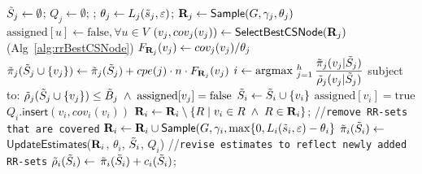 
\IncMargin{1em}
\begin{algorithm}[t!]
\caption{\fastcs}
\label{alg:fastCS}
\Indm
{\small
{}
}
\Indp
{\small
{} {
$\textcolor{black}{\tilde{S}_j} \gets \emptyset$; $Q_j \gets \emptyset$; 
; $\theta_j \gets L_{\textcolor{black}{j}}(\textcolor{black}{\tilde{s}_j}, \varepsilon)$; $\mathbf{R}_j \gets \mathsf{Sample}(G, \gamma_j,\theta_j)$\;
\;
\;
$\text{assigned}[u] \leftarrow \text{false}, \forall u \in V$\;
}
\BlankLine
{} {
   {
  	  $(v_j, cov_j(v_j)) \gets \mathsf{SelectBestCSNode}(\mathbf{R}_j)$ (Alg~\ref{alg:rrBestCSNode}) \label{line:greedySelectBest}
 	  $F_{\mathbf{R}_j}(v_j) \gets cov_j(v_j) / \theta_j $\;
     $\textcolor{black}{\tilde{\pi}_j(\tilde{S}_j \cup \{v_j\}) \gets \tilde{\pi}_j(\tilde{S}_j) + cpe({j}) \cdot n \cdot F_{\mathbf{R}_j}(v_j)}$\; 	
  }
  $i \gets \operatorname*{\arg\!\max~}_{j=1}^h \dfrac{\tilde{\pi}_j(v_j | \tilde{S}_j)}{\tilde{\rho}_j(v_j | \tilde{S}_j)}$ subject to: $\tilde{\rho}_j(\tilde{S}_j \cup \{v_j\}) \le \textcolor{black}{\tilde{B}_{j}} \; \wedge \; \text{assigned}[v_j] = \text{false} $ \; \label{line:greedyCriterCS}
 {
	$\tilde{S}_i \gets \tilde{S}_i \cup \{v_i\}$\;
	$\text{assigned}[v_i] = \text{true}$\;
         $Q_i.\mathsf{insert}(v_i, cov_i(v_i)) $\;
	$\mathbf{R}_i \gets \mathbf{R}_i \setminus \{R \mid v_i \in R \; \wedge \; R \in \mathbf{R}_i\} $;
}
//{\tt remove RR-sets that are covered}\;
 {
	\;
  	$\mathbf{R}_i \gets \mathbf{R}_i \cup \mathsf{Sample}(G, \gamma_i, \max\{0, L_{\textcolor{black}{i}}(\tilde{s}_i,\varepsilon) - \theta_i \}$\; 	
  	\;
  	$\tilde{\pi}_i(\tilde{S}_i) \gets$ $\mathsf{UpdateEstimates}$($\mathbf{R}_i$, $\theta_i$, $\tilde{S}_i$, $Q_i$)\;
  	\;
//{\tt revise estimates to reflect newly added RR-sets}\;
  	$\tilde{\rho}_i(\tilde{S}_i) \gets$ $\tilde{\pi}_i(\tilde{S}_i) + c_i(\tilde{S}_i)$;
}
}
}
\end{algorithm}


